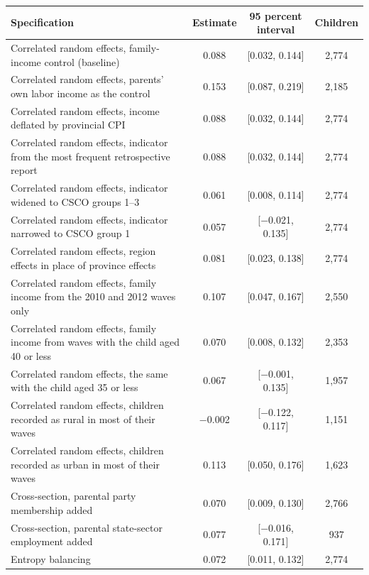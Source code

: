 \begin{tabular}{@{}p{9.4cm}ccc@{}}
\toprule
Specification & Estimate & 95 percent interval & Children \\
\midrule
Correlated random effects, family-income control (baseline) & 0.088 & [0.032, 0.144] & 2,774 \\
Correlated random effects, parents' own labor income as the control & 0.153 & [0.087, 0.219] & 2,185 \\
Correlated random effects, income deflated by provincial CPI & 0.088 & [0.032, 0.144] & 2,774 \\
Correlated random effects, indicator from the most frequent retrospective report & 0.088 & [0.032, 0.144] & 2,774 \\
Correlated random effects, indicator widened to CSCO groups 1--3 & 0.061 & [0.008, 0.114] & 2,774 \\
Correlated random effects, indicator narrowed to CSCO group 1 & 0.057 & [$-$0.021, 0.135] & 2,774 \\
Correlated random effects, region effects in place of province effects & 0.081 & [0.023, 0.138] & 2,774 \\
Correlated random effects, family income from the 2010 and 2012 waves only & 0.107 & [0.047, 0.167] & 2,550 \\
Correlated random effects, family income from waves with the child aged 40 or less & 0.070 & [0.008, 0.132] & 2,353 \\
Correlated random effects, the same with the child aged 35 or less & 0.067 & [$-$0.001, 0.135] & 1,957 \\
Correlated random effects, children recorded as rural in most of their waves & $-$0.002 & [$-$0.122, 0.117] & 1,151 \\
Correlated random effects, children recorded as urban in most of their waves & 0.113 & [0.050, 0.176] & 1,623 \\
Cross-section, parental party membership added & 0.070 & [0.009, 0.130] & 2,766 \\
Cross-section, parental state-sector employment added & 0.077 & [$-$0.016, 0.171] & 937 \\
Entropy balancing & 0.072 & [0.011, 0.132] & 2,774 \\
\bottomrule
\end{tabular}
